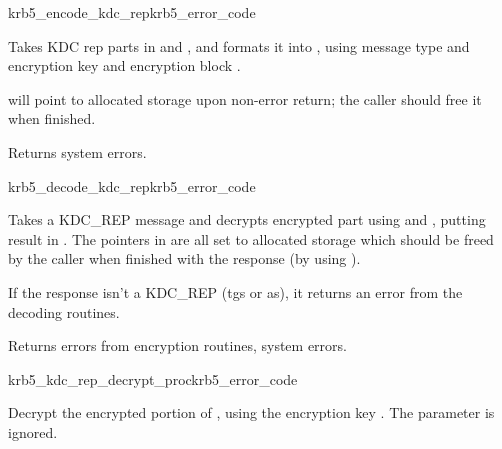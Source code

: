\begin{funcdecl}{krb5_encode_kdc_rep}{krb5_error_code}{\funcin}
\funcinout
{}
\funcout
{}
\end{funcdecl}

\internalfunc

Takes KDC rep parts in  and , and
formats it into , using message type
 and encryption key  and
encryption block .

 will point to  allocated storage upon
non-error return; the caller should free it when finished.

Returns system errors.

\begin{funcdecl}{krb5_decode_kdc_rep}{krb5_error_code}{\funcinout}
\funcin
{}
\funcout
{}
\end{funcdecl}

\internalfunc

Takes a KDC_REP message and decrypts encrypted part using
 and , putting result in .
The pointers in 
are all set to allocated storage which should be freed by the caller
when finished with the response (by using ).


If the response isn't a KDC_REP (tgs or as), it returns an error from
the decoding routines.

Returns errors from encryption routines, system errors.

\begin{funcdecl}{krb5_kdc_rep_decrypt_proc}{krb5_error_code}{\funcinout}
\funcin
{}
\funcinout
{}
\end{funcdecl}

Decrypt the encrypted portion of , using the
encryption key .  The parameter  is
ignored.

